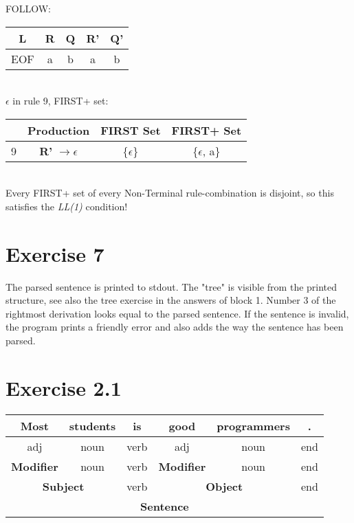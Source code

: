 \documentclass[11pt]{article} %
\begin{document}
\noindent FOLLOW: \\

\begin{tabular}{|c|c|c|c|c|} \hline 
\textbf{L}
& \textbf{R}
& \textbf{Q}
& \textbf{R'}
& \textbf{Q'} \\\hline

EOF
& a
& b
& a
& b \\\hline  
\end{tabular} \\

\noindent $\epsilon$ in rule 9, FIRST+ set: \\

\begin{tabular}{|c|c|c|c|} \hline 
& Production
& FIRST Set
& FIRST+ Set \\\hline

9
& \textbf{R'} $\rightarrow \epsilon$
& \{$\epsilon$\}
& \{$\epsilon$, a\} \\\hline 
\end{tabular}\\

\noindent Every FIRST+ set of every Non-Terminal rule-combination is disjoint, so this satisfies the \textit{LL(1)} condition!


\section*{Exercise 7}
The parsed sentence is printed to stdout. The "tree" is visible from the printed structure, see also the tree exercise in the answers of block 1. Number 3 of the rightmost derivation looks equal to the parsed sentence. If the sentence is invalid, the program prints a friendly error and also adds the way the sentence has been parsed.

\iffalse
\section*{Exercise 2.1}
\begin{tabular}{|c|c|c|c|c|c|}	\hline
Most 				& students 			& is 	& good 					& programmers 	& . 		\\\hline
adj 				& noun 				& verb 	& adj 					& noun 			& end 		\\\hline
\textbf{Modifier}	& noun				& verb	& \textbf{Modifier}		& noun			& end		\\\hline
\multicolumn{2}{|c|}{\textbf{Subject}}	& verb 	& \multicolumn{2}{c|}{\textbf{Object}}	& end		\\\hline
\multicolumn{6}{|c|}{\textbf{Sentence}}																\\\hline
\end{tabular}
\end{document}
